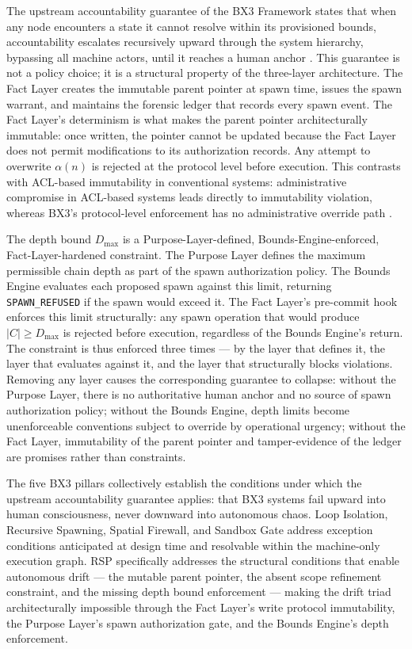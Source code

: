 The upstream accountability guarantee of the BX3 Framework states that when any node encounters a state it cannot resolve within its provisioned bounds, accountability escalates recursively upward through the system hierarchy, bypassing all machine actors, until it reaches a human anchor \cite{bx3-framework,bx3framework2026}. This guarantee is not a policy choice; it is a structural property of the three-layer architecture. The Fact Layer creates the immutable parent pointer at spawn time, issues the spawn warrant, and maintains the forensic ledger that records every spawn event. The Fact Layer's determinism is what makes the parent pointer architecturally immutable: once written, the pointer cannot be updated because the Fact Layer does not permit modifications to its authorization records. Any attempt to overwrite $\alpha(n)$ is rejected at the protocol level before execution. This contrasts with ACL-based immutability in conventional systems: administrative compromise in ACL-based systems leads directly to immutability violation, whereas BX3's protocol-level enforcement has no administrative override path \cite{bx3-framework,bansal2019}.

The depth bound $D_{\max}$ is a Purpose-Layer-defined, Bounds-Engine-enforced, Fact-Layer-hardened constraint. The Purpose Layer defines the maximum permissible chain depth as part of the spawn authorization policy. The Bounds Engine evaluates each proposed spawn against this limit, returning \texttt{SPAWN\_REFUSED} if the spawn would exceed it. The Fact Layer's pre-commit hook enforces this limit structurally: any spawn operation that would produce $|C| \geq D_{\max}$ is rejected before execution, regardless of the Bounds Engine's return. The constraint is thus enforced three times --- by the layer that defines it, the layer that evaluates against it, and the layer that structurally blocks violations. Removing any layer causes the corresponding guarantee to collapse: without the Purpose Layer, there is no authoritative human anchor and no source of spawn authorization policy; without the Bounds Engine, depth limits become unenforceable conventions subject to override by operational urgency; without the Fact Layer, immutability of the parent pointer and tamper-evidence of the ledger are promises rather than constraints.

The five BX3 pillars collectively establish the conditions under which the upstream accountability guarantee applies: that BX3 systems fail upward into human consciousness, never downward into autonomous chaos. Loop Isolation, Recursive Spawning, Spatial Firewall, and Sandbox Gate address exception conditions anticipated at design time and resolvable within the machine-only execution graph. RSP specifically addresses the structural conditions that enable autonomous drift --- the mutable parent pointer, the absent scope refinement constraint, and the missing depth bound enforcement --- making the drift triad architecturally impossible through the Fact Layer's write protocol immutability, the Purpose Layer's spawn authorization gate, and the Bounds Engine's depth enforcement.
